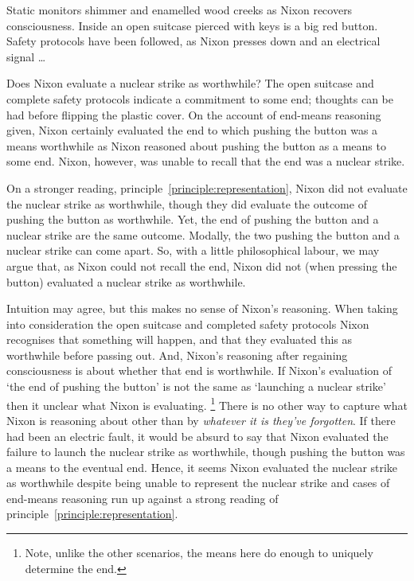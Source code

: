 \documentclass[10pt]{article}
\begin{document}
\begin{scenario}
  Static monitors shimmer and enamelled wood creeks as Nixon recovers consciousness. Inside an open suitcase pierced with keys is a big red button. Safety protocols have been followed, as Nixon presses down and an electrical signal \dots
\end{scenario}


Does Nixon evaluate a nuclear strike as worthwhile?
The open suitcase and complete safety protocols indicate a commitment to some end; thoughts can be had before flipping the plastic cover.
On the account of end-means reasoning given, Nixon certainly evaluated the end to which pushing the button was a means worthwhile as Nixon reasoned about pushing the button as a means to some end.
Nixon, however, was unable to recall that the end was a nuclear strike.

On a stronger reading, principle~\ref{principle:representation}, Nixon did not evaluate the nuclear strike as worthwhile, though they did evaluate the outcome of pushing the button as worthwhile.
Yet, the end of pushing the button and a nuclear strike are the same outcome.
Modally, the two pushing the button and a nuclear strike can come apart.
So, with a little philosophical labour, we may argue that, as Nixon could not recall the end, Nixon did not (when pressing the button) evaluated a nuclear strike as worthwhile.

Intuition may agree, but this makes no sense of Nixon's reasoning.
When taking into consideration the open suitcase and completed safety protocols Nixon recognises that something will happen, and that they evaluated this as worthwhile before passing out.
And, Nixon's reasoning after regaining consciousness is about whether that end is worthwhile.
If Nixon's evaluation of `the end of pushing the button' is not the same as `launching a nuclear strike' then it unclear what Nixon is evaluating.\nolinebreak
\footnote{Note, unlike the other scenarios, the means here do enough to uniquely determine the end.}
There is no other way to capture what Nixon is reasoning about other than by \emph{whatever it is they've forgotten}.
If there had been an electric fault, it would be absurd to say that Nixon evaluated the failure to launch the nuclear strike as worthwhile, though pushing the button was a means to the eventual end.
Hence, it seems Nixon evaluated the nuclear strike as worthwhile despite being unable to represent the nuclear strike and cases of end-means reasoning run up against a strong reading of principle~\ref{principle:representation}.
\end{document}
